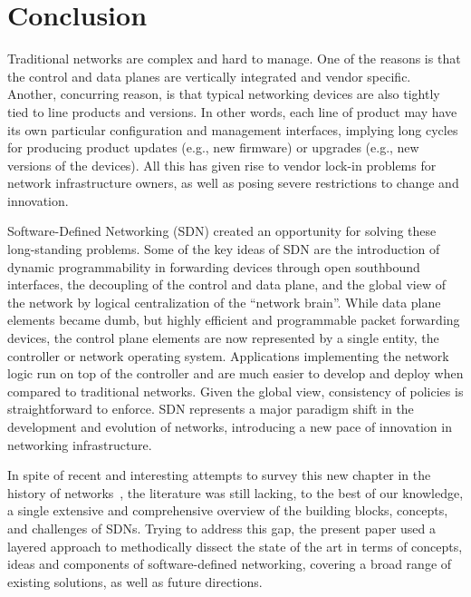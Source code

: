 \section{Conclusion}

Traditional networks are complex and hard to manage.  One
of the reasons is that the control and data planes are vertically
integrated and vendor specific. Another, concurring reason, is that
typical networking devices are also tightly tied to line products and
versions.  In other words, each line of product may have its own
particular configuration and management interfaces, implying long
cycles for producing product updates (e.g., new firmware) or upgrades
(e.g., new versions of the devices). All this has given rise to vendor
lock-in problems for network infrastructure owners, as well as posing
severe restrictions to change and innovation.

Software-Defined Networking (SDN) created an opportunity for solving
these long-standing problems.  Some of the key ideas of SDN are the
introduction of dynamic programmability in forwarding devices through
open southbound interfaces, the decoupling of the control and data
plane, and the global view of the network by logical centralization of
the ``network brain''.  While data plane elements became dumb, but
highly efficient and programmable packet forwarding devices, the
control plane elements are now represented by a single entity, the
controller or network operating system.  Applications implementing the
network logic run on top of the controller and are much easier to
develop and deploy when compared to traditional networks. Given the
global view, consistency of policies is straightforward to enforce.
SDN represents a major paradigm shift in the development and
evolution of networks, introducing a new pace of innovation in networking infrastructure.

In spite of recent and interesting attempts to survey this new chapter
in the history of networks~\cite{lara2014,jarraya2014,nunes2014}, the
literature was still lacking, to the best of our knowledge, a single
extensive and comprehensive overview of the building blocks, concepts,
and challenges of SDNs.
%
%
Trying to address this gap, the present paper used a layered approach
to methodically dissect the state of the art in terms of concepts,
ideas and components of software-defined networking, covering a broad
range of existing solutions, as well as future directions.

